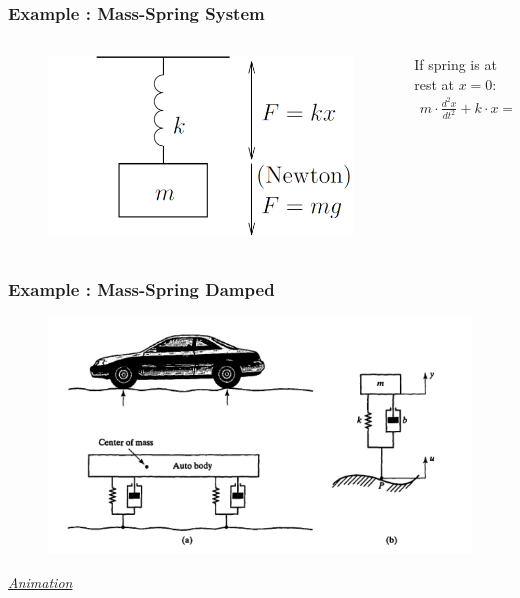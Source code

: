 \begin{frame}
	\frametitle{Example : Mass-Spring System} 
	
	\begin{columns}
		\begin{column}{0.4\linewidth}
			\begin{figure}
			\centering
			\includegraphics[width=1\linewidth]{img/mass-spring}
			\label{fig:mass-spring}
			\end{figure}
		\end{column}
		\begin{column}{0.6\linewidth}
			If spring is at rest at $x=0$:
			\begin{align*}
			m \cdot \frac{d^{2}x}{dt^{2}} + k \cdot x =  m \cdot g \\
			\end{align*}
		\end{column}
	\end{columns}
\end{frame}


\begin{frame}
	\frametitle{Example : Mass-Spring Damped}
	\begin{figure}
\centering
\includegraphics[width=1\linewidth]{img/mass-spring-damped}
\label{fig:mass-spring-damped}
\end{figure}
\emph{\textcolor{blue}{ \href{https://youtu.be/8DuJEpy-ODo}{Animation} }}
\end{frame}

